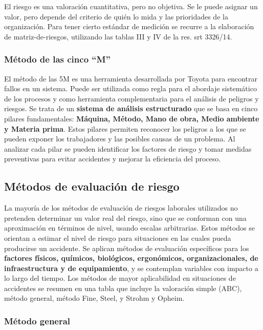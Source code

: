 El \gls{riesgo} es una valoración cuantitativa, pero no objetiva. Se le puede 
asignar un valor, pero depende del criterio de quién lo mida y las prioridades
de la organización. Para tener cierto estándar de medición se recurre a la 
elaboración de \glspl{matriz-de-riesgo}, utilizando las tablas III y IV de la
res. \acrshort{srt} 3326/14.

\subsubsection{Método de las cinco ``M''}

El método de las 5M es una herramienta desarrollada por Toyota para encontrar
fallos en un sistema. Puede ser utilizada como regla para el abordaje
sistemático de los procesos y como herramienta complementaria para el análisis
de peligros y riesgos. Se trata de un \textbf{sistema de análisis estructurado}
que se basa en cinco pilares fundamentales: \textbf{Máquina, Método, Mano de
	obra, Medio ambiente y Materia prima}. Estos pilares permiten reconocer los
peligros a los que se pueden exponer los trabajadores y las posibles causas de
un problema. Al analizar cada pilar se pueden identificar los factores de
riesgo y tomar medidas preventivas para evitar accidentes y mejorar la
eficiencia del proceso.

\subsection{Métodos de evaluación de riesgo}

La mayoría de los métodos de evaluación de riesgos laborales utilizados no
pretenden determinar un valor real del riesgo, sino que se conforman con una
aproximación en términos de nivel, usando escalas arbitrarias. Estos métodos
se orientan a estimar el nivel de riesgo para situaciones en las cuales pueda
producirse un accidente. Se aplican métodos de evaluación específicos para los
\textbf{factores físicos, químicos, biológicos, ergonómicos, organizacionales, 
    de infraestructura y de equipamiento}, y se contemplan variables con impacto
a lo largo del tiempo. Los métodos de mayor aplicabilidad en situaciones de
accidentes se resumen en una tabla que incluye la valoración simple (ABC),
método general, método Fine, Steel, y Strohm y Opheim.

\subsubsection{Método general}

